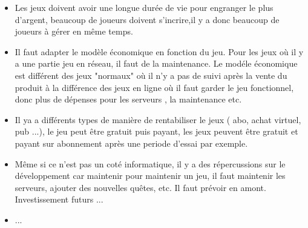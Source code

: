\documentclass[11pt,a4paper]{article}
\begin{document}
	
  \begin{itemize}
  \renewcommand{\labelitemi}{$\Rightarrow$}
	\item Les jeux doivent avoir une longue durée de vie pour engranger le plus d'argent, beaucoup de joueurs doivent s'incrire,il y a donc beaucoup de joueurs à gérer en même temps.
	\item Il  faut adapter le modèle économique en fonction du jeu. Pour les jeux où il y a une partie jeu en réseau, il faut de la maintenance. Le  modéle économique est différent des jeux "normaux" où il n'y a pas de suivi après la vente du produit à la différence des jeux en ligne où il faut garder le jeu fonctionnel, donc plus de dépenses pour les serveurs , la maintenance etc.
	\item Il ya a différents types de manière de rentabiliser le jeux ( abo, achat virtuel, pub ...), le jeu peut être gratuit puis payant, les jeux peuvent être gratuit et payant sur abonnement après une periode d'essai par exemple.
	\item Même si ce n'est pas un coté informatique, il y a des répercussions sur le développement car maintenir pour maintenir un jeu, il faut maintenir les serveurs, ajouter des nouvelles quêtes, etc. Il faut prévoir en amont. Investissement futurs ...
	\item ...
  \end{itemize}
\end{document}
